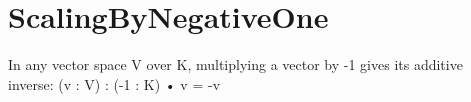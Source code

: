 \section{ScalingByNegativeOne}

\begin{theorem}
  \label{theorem : neg_one_smul_v}
  \leanok
  In any vector space V over K, multiplying a vector by -1 gives its additive inverse: (v : V) : (-1 : K) • v = -v
\end{theorem}
